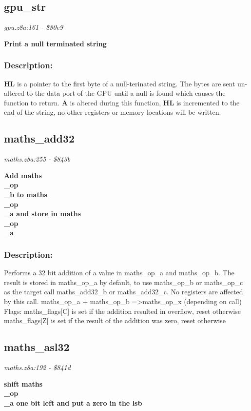 \subsection{gpu\_str}
\textit{gpu.z8a:161 - \$80e9}

\noindent
\textbf{Print a null terminated string}

\subsubsection{Description:}
 \textbf{HL} is a pointer to the first byte of a null-terinated string.  The bytes are sent un-altered to the data port of the GPU until a null is found which causes the function to return.  \textbf{A} is altered during this function, \textbf{HL} is incremented to the end of the string, no other registers or memory locations will be written.

\subsection{maths\_add32}
\textit{maths.z8a:255 - \$843b}

\noindent
\textbf{Add maths\\\_op\\\_b to maths\\\_op\\\_a and store in maths\\\_op\\\_a}

\subsubsection{Description:}
 Performs a 32 bit addition of a value in maths\_op\_a and maths\_op\_b.  The result is stored in maths\_op\_a by default, to use maths\_op\_b or maths\_op\_c as the target call maths\_add32\_b or maths\_add32\_c.  No registers are affected by this call. maths\_op\_a + maths\_op\_b =\textgreater  maths\_op\_x (depending on call) Flags:  maths\_flags[C] is set if the addition resulted in overflow, reset otherwise  maths\_flags[Z] is set if the result of the addition was zero, reset                 otherwise

\subsection{maths\_asl32}
\textit{maths.z8a:192 - \$841d}

\noindent
\textbf{shift maths\\\_op\\\_a one bit left and put a zero in the lsb}

